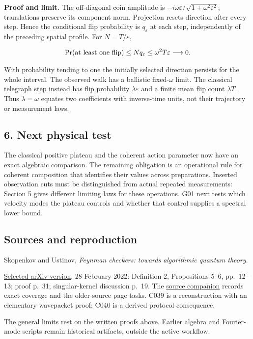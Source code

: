 \documentclass[11pt,a4paper]{article}
\begin{document}
\textbf{Proof and limit.} The off-diagonal coin amplitude is
\(-i\omega\varepsilon/\sqrt{1+\omega^2\varepsilon^2}\); translations
preserve its component norm. Projection resets direction after every
step. Hence the conditional flip probability is \(q_\varepsilon\) at
each step, independently of the preceding spatial profile. For
\(N=T/\varepsilon\),

\[
\Pr(\hbox{at least one flip})\le Nq_\varepsilon
\le\omega^2T\varepsilon\longrightarrow0.
\]

With probability tending to one the initially selected direction
persists for the whole interval. The observed walk has a ballistic
fixed-\(\omega\) limit. The classical telegraph step instead has flip
probability \(\lambda\varepsilon\) and a finite mean flip count
\(\lambda T\). Thus \(\lambda=\omega\) equates two coefficients with
inverse-time units, not their trajectory or measurement laws.

\hypertarget{next-physical-test}{%
\subsection{6. Next physical test}\label{next-physical-test}}

The classical positive plateau and the coherent action parameter now
have an exact algebraic comparison. The remaining obligation is an
operational rule for coherent composition that identifies their values
across preparations. Inserted observation cuts must be distinguished
from actual repeated measurements: Section 5 gives different limiting
laws for these operations. G01 next tests which velocity modes the
plateau controls and whether that control supplies a spectral lower
bound.

\hypertarget{sources-and-reproduction}{%
\subsection{Sources and reproduction}\label{sources-and-reproduction}}

Skopenkov and Ustinov, \emph{Feynman checkers: towards algorithmic
quantum theory}.

\href{https://arxiv.org/abs/2007.12879v2}{Selected arXiv version}, 28
February 2022: Definition 2, Propositions 5--6, pp.~12--13; proof p.~31;
singular-kernel discussion p.~19. The
\href{../docs/batches/B18/checkerboard-recurrence-source-companion.md}{source
companion} records exact coverage and the older-source page tasks. C039
is a reconstruction with an elementary wavepacket proof; C040 is a
derived protocol consequence.

The general limits rest on the written proofs above. Earlier algebra and
Fourier-mode scripts remain historical artifacts, outside the active
workflow.
\end{document}

